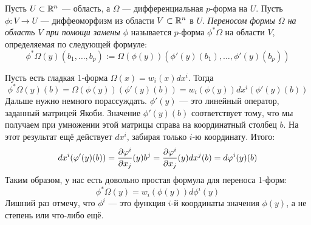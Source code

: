 \begin{definition}
	Пусть $U \subset \mathbb{R}^n$ --- область, а $\Omega$ --- дифференциальная $p$-форма на $U$. Пусть $\phi \colon V \to U$ --- диффеоморфизм из области $V \subset \mathbb{R}^n$ в $U$. \textit{Переносом формы $\Omega$ на область $V$ при помощи замены $\phi$} называется $p$-форма $\phi^*\Omega$ на области $V$, определяемая по следующей формуле:
	\[
		\phi^*\Omega(y)(b_1, \ldots, b_p) := \Omega(\phi(y))(\phi'(y)(b_1), \ldots, \phi'(y)(b_p))
	\]
\end{definition}

\begin{example}
	Пусть есть гладкая 1-форма $\Omega(x) = w_i(x)dx^i$. Тогда
	\[
		\phi^*\Omega(y)(b) = \Omega(\phi(y))(\phi'(y)(b)) = w_i(\phi(y)) dx^i(\phi'(y)(b))
	\]
	Дальше нужно немного порассуждать. $\phi'(y)$ --- это линейный оператор, заданный матрицей Якоби. Значение $\phi'(y)(b)$ соответствует тому, что мы получаем при умножении этой матрицы справа на координатный столбец $b$. На этот результат ещё действует $dx^i$, забирая только $i$-ю координату. Итого:
	\[
		dx^i(\varphi'(y)(b)) = \frac{\partial \varphi^i}{\partial x_j}(y) b^j = \frac{\partial \varphi^i}{\partial x_j}(y) dx^j(b) = d\varphi^i(y)(b)
	\]
	Таким образом, у нас есть довольно простая формула для переноса 1-форм:
	\[
		\phi^*\Omega(y) = w_i(\phi(y)) d\phi^i(y)
	\]
	Лишний раз отмечу, что $\phi^i$ --- это функция $i$-й координаты значения $\phi(y)$, а не степень или что-либо ещё.
\end{example}